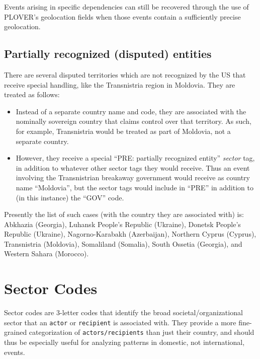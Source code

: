 \documentclass[11pt]{report}
\begin{document}
Events arising in specific dependencies can still be recovered through the use of PLOVER's geolocation fields when those events contain a sufficiently precise geolocation.

\subsection{Partially recognized (disputed) entities}\label{partially-recognized-entities}

There are several disputed territories which are not recognized by the US that receive special handling, like the Transnistria region in Moldovia. They are treated as follows:

\begin{itemize}
\item Instead of a separate country name and code, they are associated with the nominally sovereign country that claims control over that territory. As such, for example, Transnistria would be treated as part of Moldovia, not a separate country.
\item However, they receive a special ``PRE: partially recognized entity'' \textit{sector} tag, in addition to whatever other sector tags they would receive. Thus an event involving the Transnistrian breakaway government would receive as country name ``Moldovia'', but the sector tags would include in ``PRE'' in addition to (in this instance) the ``GOV'' code.
\end{itemize}

Presently the list of such cases (with the country they are associated with) is: Abkhazia (Georgia), Luhansk People's Republic (Ukraine), Donetsk People's Republic (Ukraine), Nagorno-Karabakh (Azerbaijan), Northern Cyprus (Cyprus), Transnistria (Moldovia), Somaliland (Somalia), South Ossetia (Georgia), and Western Sahara (Morocco).


\clearpage
\newpage

\section{Sector Codes}

Sector codes are 3-letter codes that identify the broad societal/organizational sector that an \texttt{actor} or \texttt{recipient} is associated with. They provide a more fine-grained categorization of \texttt{actors/recipients} than just their country, and should thus be especially useful for analyzing patterns in domestic, not international, events.
\end{document}
